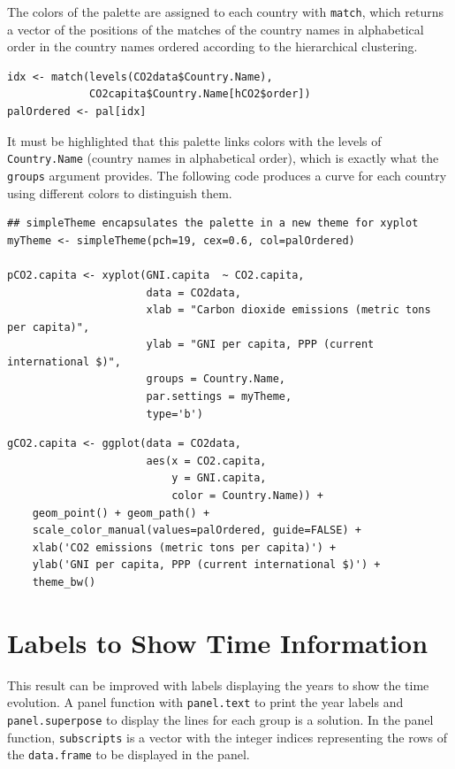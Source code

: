 The colors of the palette are assigned to each country with \texttt{match},
which returns a vector of the positions of the matches of the country
names in alphabetical order in the country names ordered according to
the hierarchical clustering.
\lstset{language=r,label= ,caption= ,captionpos=b,numbers=none}
\begin{lstlisting}
idx <- match(levels(CO2data$Country.Name), 
             CO2capita$Country.Name[hCO2$order])
palOrdered <- pal[idx]  
\end{lstlisting}
It must be highlighted that this palette links colors with the levels
of \texttt{Country.Name} (country names in alphabetical order), which is
exactly what the \texttt{groups} argument provides. The following code
produces a curve for each country using different colors to
distinguish them.

\lstset{language=r,label= ,caption= ,captionpos=b,numbers=none}
\begin{lstlisting}
## simpleTheme encapsulates the palette in a new theme for xyplot
myTheme <- simpleTheme(pch=19, cex=0.6, col=palOrdered)

pCO2.capita <- xyplot(GNI.capita  ~ CO2.capita,
                      data = CO2data,
                      xlab = "Carbon dioxide emissions (metric tons per capita)",
                      ylab = "GNI per capita, PPP (current international $)",
                      groups = Country.Name,
                      par.settings = myTheme,
                      type='b')
\end{lstlisting}

\lstset{language=r,label= ,caption= ,captionpos=b,numbers=none}
\begin{lstlisting}
gCO2.capita <- ggplot(data = CO2data,
                      aes(x = CO2.capita,
                          y = GNI.capita,
                          color = Country.Name)) +
    geom_point() + geom_path() +
    scale_color_manual(values=palOrdered, guide=FALSE) +
    xlab('CO2 emissions (metric tons per capita)') +
    ylab('GNI per capita, PPP (current international $)') +
    theme_bw()
\end{lstlisting}

\section{Labels to Show Time Information}
\label{sec:org8215fc3}
This result can be improved with labels displaying the years to show
the time evolution.  A panel function with \texttt{panel.text} to print the
year labels and \texttt{panel.superpose} to display the lines for each group
is a solution. In the panel function, \texttt{subscripts} is a vector with
the integer indices representing the rows of the \texttt{data.frame} to be
displayed in the panel.

